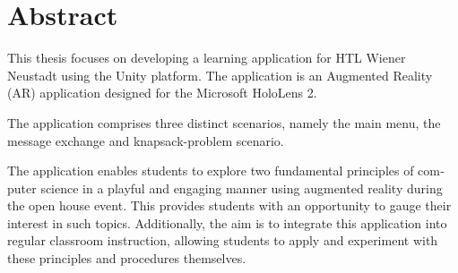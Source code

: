 \chapter{Abstract}

\begin{english} %
This thesis focuses on developing a learning application for HTL Wiener Neustadt using the Unity platform. The application
is an Augmented Reality (AR) application designed for the Microsoft HoloLens 2.

The application comprises three distinct scenarios, namely the main menu, the message exchange and knapsack-problem scenario.

The application enables students to explore two fundamental principles of computer science in a playful and engaging
manner using augmented reality during the open house event. This provides students with an opportunity to gauge their
interest in such topics. Additionally, the aim is to integrate this application into regular classroom instruction, allowing
students to apply and experiment with these principles and procedures themselves.
\end{english}


